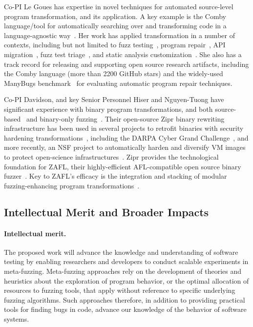 Co-PI Le Goues has expertise in novel techniques for automated
source-level program transformation, and its application.  A key example is the
Comby language/tool for automatically searching over and transforming code in a
language-agnostic way~\cite{rvt-ppc,comby-github}.  Her work has applied transformation in a number of
contexts, including but not limited to fuzz testing~\cite{cc2022}, 
program repair~\cite{wong21varfix,legouesNFWTSE2012,footpatch}, API migration~\cite{ni21soar}, fuzz test
triage~\cite{vantonder-ase18}, and static analysis customization~\cite{vanTonder-tailoring20}.  She
also has a track record for releasing and supporting open source research
artifacts, including the Comby language (more than 2200 GitHub stars) and the
widely-used ManyBugs benchmark~\cite{legoues15tse} for evaluating automatic program
repair techniques.

Co-PI Davidson, and key Senior Personnel Hiser and Nguyen-Tuong have significant
experience with binary program transformations, and both source-based~\cite{ahmed2021bigmap} and binary-only fuzzing~\cite{nagy2021breaking,nagy2021same}.
Their open-source Zipr binary rewriting infrastructure has been used in several
projects to retrofit binaries with security hardening transformations~\cite{zipr,hawkins2017zipr,hawkins2017securing,hiser2017zipr++,schulte2022broad}, including
the DARPA Cyber Grand Challenge~\cite{nguyen2018xandra}, and more recently, an NSF project to automatically harden and diversify VM images
to protect open-science infrastructures~\cite{davidson2023helix++}. 
Zipr provides the technological foundation for ZAFL, their highly-efficient AFL-compatible open source binary fuzzer~\cite{zafl}.
Key to ZAFL's efficacy is the integration and stacking of modular fuzzing-enhancing program transformations~\cite{nagy2021breaking,nagy2021same}.

\subsection{Intellectual Merit and Broader Impacts}

\paragraph{Intellectual merit.} The proposed work will advance the
knowledge and understanding of software testing by enabling
researchers and developers to conduct scalable experiments in meta-fuzzing.  
Meta-fuzzing approaches rely on the development of theories and heuristics 
about the exploration of program behavior, or the optimal allocation of 
resources to fuzzing tools, that apply without reference to specific underlying 
fuzzing algorithms.  Such approaches therefore, in addition to providing 
practical tools for finding bugs in code, advance our knowledge of the behavior 
of software systems.

